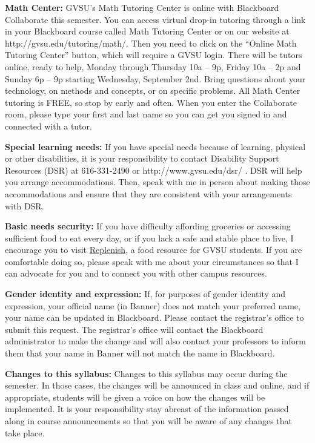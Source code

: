 \documentclass[]{article}
\begin{document}
\textbf{Math Center:} GVSU's Math Tutoring Center is online with
Blackboard Collaborate this semester. You can access virtual drop-in
tutoring through a link in your Blackboard course called Math Tutoring
Center or on our website at http://gvsu.edu/tutoring/math/. Then you
need to click on the ``Online Math Tutoring Center'' button, which will
require a GVSU login. There will be tutors online, ready to help, Monday
through Thursday 10a -- 9p, Friday 10a -- 2p and Sunday 6p -- 9p
starting Wednesday, September 2nd. Bring questions about your
technology, on methods and concepts, or on specific problems. All Math
Center tutoring is FREE, so stop by early and often. When you enter the
Collaborate room, please type your first and last name so you can get
you signed in and connected with a tutor.

\textbf{Special learning needs:} If you have special needs because of
learning, physical or other disabilities, it is your responsibility to
contact Disability Support Resources (DSR) at 616-331-2490 or
http://www.gvsu.edu/dsr/ . DSR will help you arrange accommodations.
Then, speak with me in person about making those accommodations and
ensure that they are consistent with your arrangements with DSR.

\textbf{Basic needs security:} If you have difficulty affording
groceries or accessing sufficient food to eat every day, or if you lack
a safe and stable place to live, I encourage you to visit
\href{https://www.gvsu.edu/replenish/}{Replenish}, a food resource for
GVSU students. If you are comfortable doing so, please speak with me
about your circumstances so that I can advocate for you and to connect
you with other campus resources.

\textbf{Gender identity and expression:} If, for purposes of gender
identity and expression, your official name (in Banner) does not match
your preferred name, your name can be updated in Blackboard. Please
contact the registrar's office to submit this request. The registrar's
office will contact the Blackboard administrator to make the change and
will also contact your professors to inform them that your name in
Banner will not match the name in Blackboard.

\textbf{Changes to this syllabus:} Changes to this syllabus may occur
during the semester. In those cases, the changes will be announced in
class and online, and if appropriate, students will be given a voice on
how the changes will be implemented. It is your responsibility stay
abreast of the information passed along in course announcements so that
you will be aware of any changes that take place.
\end{document}
